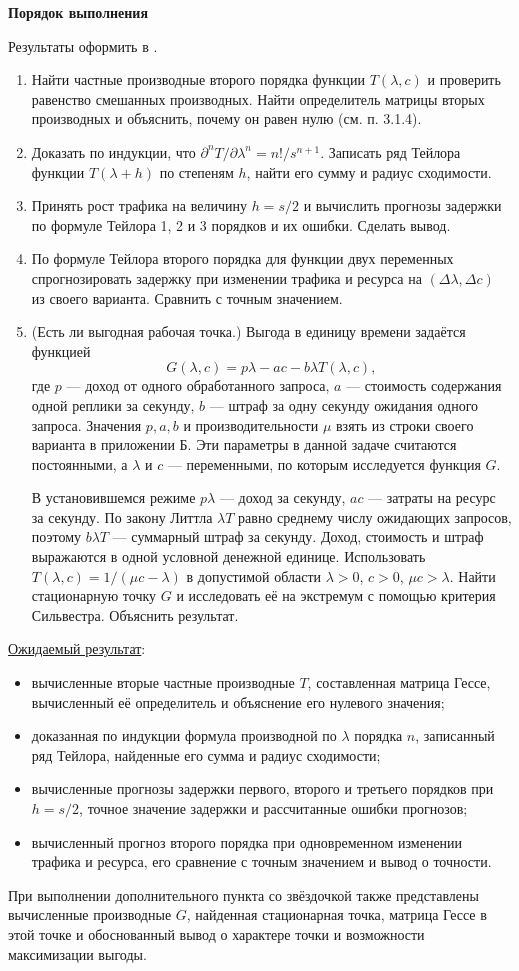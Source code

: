 \documentclass[12pt,a4paper]{article}
\newcommand{\taskhead}[1]{\par\textbf{#1}\par}
\begin{document}
\taskhead{Порядок выполнения}
Результаты оформить в .
\begin{enumerate}
\item Найти частные производные второго порядка функции $T(\lambda,c)$ и проверить
равенство смешанных производных. Найти определитель матрицы вторых производных
и объяснить, почему он равен нулю (см. п. 3.1.4).
\item Доказать по индукции, что $\partial^nT/\partial\lambda^n=n!/s^{n+1}$.
Записать ряд Тейлора функции $T(\lambda+h)$ по степеням $h$, найти его сумму
и радиус сходимости.
\item Принять рост трафика на величину $h=s/2$ и вычислить прогнозы задержки по формуле
Тейлора 1, 2 и 3 порядков и их ошибки. Сделать вывод.
\item По формуле Тейлора второго порядка для функции двух переменных
спрогнозировать задержку при изменении трафика и ресурса на
$(\Delta\lambda,\Delta c)$ из своего варианта. Сравнить с точным значением.
\item[5*.] (Есть ли выгодная рабочая точка.) Выгода в единицу времени задаётся функцией
\[
G(\lambda,c)=p\lambda-ac-b\lambda T(\lambda,c),
\]
где $p$ --- доход от одного обработанного запроса,
$a$ --- стоимость содержания одной реплики за секунду,
$b$ --- штраф за одну секунду ожидания одного запроса.
Значения $p,a,b$ и производительности $\mu$ взять из строки своего варианта
в приложении Б. Эти параметры в данной задаче считаются постоянными,
а $\lambda$ и $c$ --- переменными, по которым исследуется функция $G$.

В установившемся режиме $p\lambda$ --- доход за секунду,
$ac$ --- затраты на ресурс за секунду. По закону Литтла
$\lambda T$ равно среднему числу ожидающих запросов, поэтому
$b\lambda T$ --- суммарный штраф за секунду.
Доход, стоимость и штраф выражаются в одной условной денежной единице.
Использовать $T(\lambda,c)=1/(\mu c-\lambda)$ в допустимой области
$\lambda>0$, $c>0$, $\mu c>\lambda$.
Найти стационарную точку $G$ и исследовать её на экстремум с помощью критерия
Сильвестра. Объяснить результат.
\end{enumerate}
\underline{Ожидаемый результат}:
\begin{itemize}
\item вычисленные вторые частные производные $T$, составленная матрица
Гессе, вычисленный её определитель и объяснение его нулевого значения;
\item доказанная по индукции формула производной по $\lambda$ порядка $n$,
записанный ряд Тейлора, найденные его сумма и радиус сходимости;
\item вычисленные прогнозы задержки первого, второго и третьего порядков
при $h=s/2$, точное значение задержки и рассчитанные ошибки прогнозов;
\item вычисленный прогноз второго порядка при одновременном изменении
трафика и ресурса, его сравнение с точным значением и вывод о точности.
\end{itemize}
При выполнении дополнительного пункта со звёздочкой также представлены
вычисленные производные $G$, найденная стационарная точка,
матрица Гессе в этой точке и обоснованный вывод о характере точки
и возможности максимизации выгоды.
\end{document}
